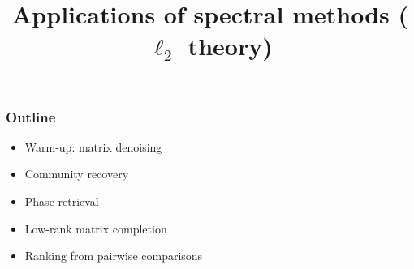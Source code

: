 \documentclass[compress,
mathserif,wide,%
]{beamer}
\title %
[Intro to spectral methods]{Applications of spectral methods ($\ell_{2}$ theory)}
\begin{document}
\begin{frame}[plain]
  \titlepage

\end{frame}


\begin{frame}
\frametitle{Outline}

\begin{itemize}
  \itemsep1em
  \item Warm-up: matrix denoising
  \item Community recovery
  \item Phase retrieval
  \item Low-rank matrix completion
  \item Ranking from pairwise comparisons
\end{itemize}

\end{frame}
\end{document}
